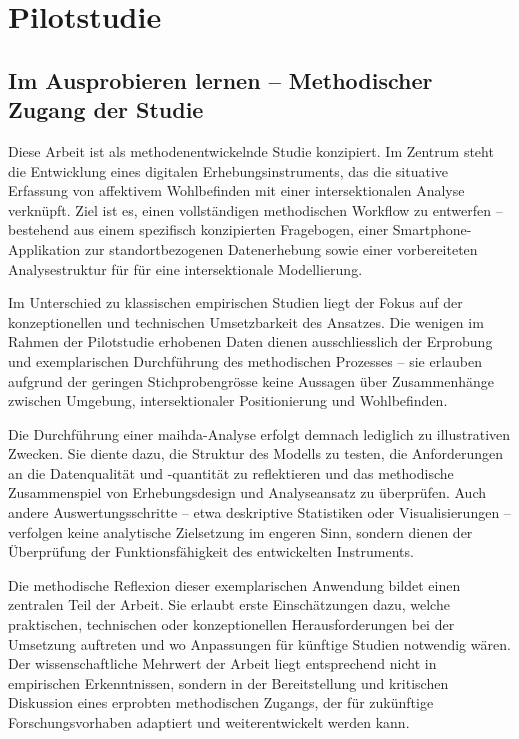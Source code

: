 \chapter{Pilotstudie}
\label{sec:pilotstudie}

\section{Im Ausprobieren lernen – Methodischer Zugang der Studie} \label{sec:methodenentwickelnd}

Diese Arbeit ist als methodenentwickelnde Studie konzipiert. Im Zentrum steht die Entwicklung eines digitalen Erhebungsinstruments, das die situative Erfassung von affektivem Wohlbefinden mit einer intersektionalen Analyse verknüpft. Ziel ist es, einen vollständigen methodischen Workflow zu entwerfen – bestehend aus einem spezifisch konzipierten Fragebogen, einer Smartphone-Applikation zur standortbezogenen Datenerhebung sowie einer vorbereiteten Analysestruktur für für eine intersektionale Modellierung.

Im Unterschied zu klassischen empirischen Studien liegt der Fokus auf der konzeptionellen und technischen Umsetzbarkeit des Ansatzes. Die wenigen im Rahmen der Pilotstudie erhobenen Daten dienen ausschliesslich der Erprobung und exemplarischen Durchführung des methodischen Prozesses – sie erlauben aufgrund der geringen Stichprobengrösse keine  Aussagen über Zusammenhänge zwischen Umgebung, intersektionaler Positionierung und Wohlbefinden.

Die Durchführung einer \acrshort{maihda}-Analyse erfolgt demnach lediglich zu illustrativen Zwecken. Sie diente dazu, die Struktur des Modells zu testen, die Anforderungen an die Datenqualität und -quantität zu reflektieren und das methodische Zusammenspiel von Erhebungsdesign und Analyseansatz zu überprüfen. Auch andere Auswertungsschritte – etwa deskriptive Statistiken oder Visualisierungen – verfolgen keine analytische Zielsetzung im engeren Sinn, sondern dienen der Überprüfung der Funktionsfähigkeit des entwickelten Instruments.

Die methodische Reflexion dieser exemplarischen Anwendung bildet einen zentralen Teil der Arbeit. Sie erlaubt erste Einschätzungen dazu, welche praktischen, technischen oder konzeptionellen Herausforderungen bei der Umsetzung auftreten und wo Anpassungen für künftige Studien notwendig wären. Der wissenschaftliche Mehrwert der Arbeit liegt entsprechend nicht in empirischen Erkenntnissen, sondern in der Bereitstellung und kritischen Diskussion eines erprobten methodischen Zugangs, der für zukünftige Forschungsvorhaben adaptiert und weiterentwickelt werden kann.

